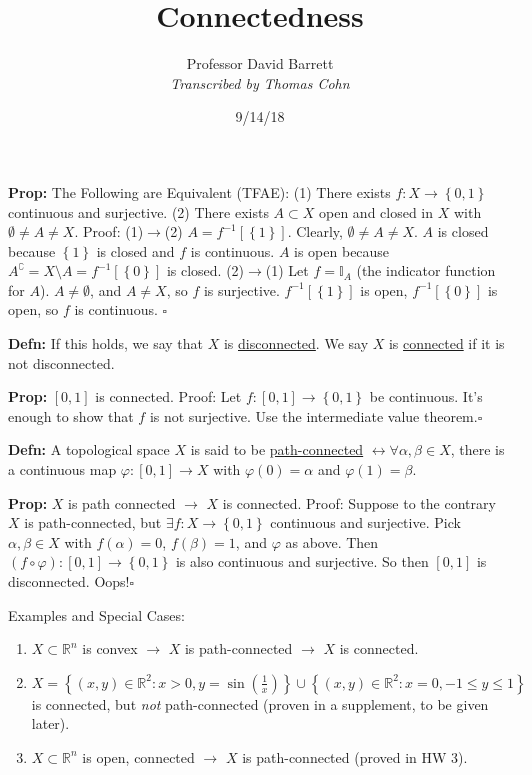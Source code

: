 \documentclass[10pt,letterpaper]{article}
\author{Professor David Barrett\\ \small\textit{Transcribed by Thomas Cohn}}
\title{Connectedness}
\date{9/14/18} %
\newcommand{\n}{\hfill\break}
\newcommand{\defn}[1]{\par\noindent\settowidth{\hangindent}{\textbf{Defn: }}\textbf{Defn: }#1\n}
\newcommand{\prop}[1]{\par\noindent\settowidth{\hangindent}{\textbf{Prop: }}\textbf{Prop: }#1\n}
\newcommand{\proven}{\;$\square$\n}
\newcommand{\set}[1]{\left\{#1\right\}}
\newcommand{\reals}{\mathbb{R}}
\newcommand{\R}{\reals}
\newcommand{\comp}{^{\complement}}
\newcommand{\inv}{^{-1}}
\newcommand{\of}{\circ}
\begin{document}
\maketitle
\setlength\RaggedRightParindent{\parindent}
\RaggedRight

\prop{The Following are Equivalent (TFAE):\n
(1) There exists $f:X\to\set{0,1}$ continuous and surjective.\n
(2) There exists $A\subset{}X$ open and closed in $X$ with $\emptyset\ne{}A\ne{}X$.\n
\n
Proof:\n
(1)${}\to{}$(2) $A=f\inv{}[\set{1}]$. Clearly, $\emptyset\ne{}A\ne{}X$. $A$ is closed because $\set{1}$ is closed and $f$ is continuous. $A$ is open because $A\comp=X\setminus{}A=f\inv{}[\set{0}]$ is closed.\n
(2)${}\to{}$(1) Let $f=\mathbb{I}_{A}$ (the indicator function for $A$). $A\ne\emptyset$, and $A\ne{}X$, so $f$ is surjective. $f\inv{}[\set{1}]$ is open, $f\inv{}[\set{0}]$ is open, so $f$ is continuous.\n
\proven}

\defn{If this holds, we say that $X$ is \underline{disconnected}. We say $X$ is \underline{connected} if it is not disconnected.}

\prop{$[0,1]$ is connected. Proof: Let $f:[0,1]\to\set{0,1}$ be continuous. It's enough to show that $f$ is not surjective. Use the intermediate value theorem.\proven}

\defn{A topological space $X$ is said to be \underline{path-connected} $\leftrightarrow\forall\alpha,\beta\in{}X$, there is a continuous map $\varphi:[0,1]\to{}X$ with $\varphi(0)=\alpha$ and $\varphi(1)=\beta$.}

\prop{$X$ is path connected $\to$ $X$ is connected.\n
Proof: Suppose to the contrary $X$ is path-connected, but $\exists{}f:X\to\set{0,1}$ continuous and surjective. Pick $\alpha,\beta\in{}X$ with $f(\alpha)=0$, $f(\beta)=1$, and $\varphi$ as above. Then $(f\of\varphi):[0,1]\to\set{0,1}$ is also continuous and surjective. So then $[0,1]$ is disconnected. Oops!\proven}

\par\noindent Examples and Special Cases:\n
\begin{enumerate}
	\item $X\subset\R^{n}$ is convex $\to$ $X$ is path-connected $\to$ $X$ is connected.
	\item $X=\set{(x,y)\in\R^{2}:x>0,y=\sin\left(\frac{1}{x}\right)}\cup\set{(x,y)\in\R^{2}:x=0,-1\le{}y\le{}1}$ is connected, but \textit{not} path-connected (proven in a supplement, to be given later).
	\item $X\subset\R^{n}$ is open, connected $\to$ $X$ is path-connected (proved in HW 3).
\end{enumerate}
\end{document}
